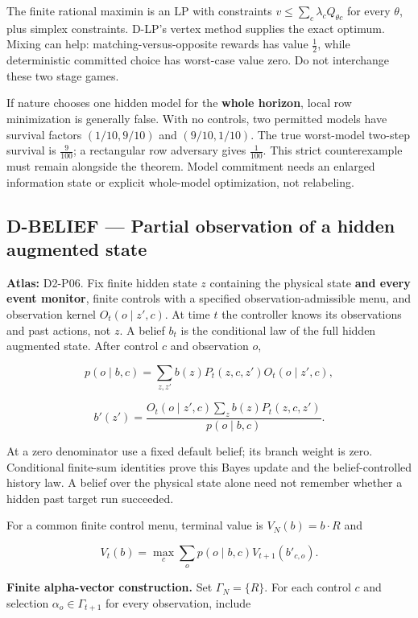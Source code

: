 \documentclass[
  11pt,
  a4paper,
]{article}
\begin{document}
The finite rational maximin is an LP with constraints
\(v\le\sum_c\lambda_cQ_{\theta c}\) for every \(\theta\), plus simplex
constraints. D-LP's vertex method supplies the exact optimum. Mixing can
help: matching-versus-opposite rewards has value \(\frac{1}{2}\), while
deterministic committed choice has worst-case value zero. Do not
interchange these two stage games.

If nature chooses one hidden model for the \textbf{whole horizon}, local
row minimization is generally false. With no controls, two permitted
models have survival factors \((1/10,9/10)\) and \((9/10,1/10)\). The
true worst-model two-step survival is \(\frac{9}{100}\); a rectangular
row adversary gives \(\frac{1}{100}\). This strict counterexample must
remain alongside the theorem. Model commitment needs an enlarged
information state or explicit whole-model optimization, not relabeling.

\subsection{D-BELIEF --- Partial observation of a hidden augmented
state}\label{d-belief-partial-observation-of-a-hidden-augmented-state}

\textbf{Atlas:} D2-P06. Fix finite hidden state \(z\) containing the
physical state \textbf{and every event monitor}, finite controls with a
specified observation-admissible menu, and observation kernel
\(O_t(o\mid z',c)\). At time \(t\) the controller knows its observations
and past actions, not \(z\). A belief \(b_t\) is the conditional law of
the full hidden augmented state. After control \(c\) and observation
\(o\),

\[p(o\mid b,c)=\sum_{z,z'}b(z)P_t(z,c,z')O_t(o\mid z',c),\]

\[b'(z')=\frac{O_t(o\mid z',c)\sum_zb(z)P_t(z,c,z')}
 {p(o\mid b,c)}.\]

At a zero denominator use a fixed default belief; its branch weight is
zero. Conditional finite-sum identities prove this Bayes update and the
belief-controlled history law. A belief over the physical state alone
need not remember whether a hidden past target run succeeded.

For a common finite control menu, terminal value is \(V_N(b)=b\cdot R\)
and

\[V_t(b)=\max_c\sum_o p(o\mid b,c)V_{t+1}(b'_{c,o}).\]

\textbf{Finite alpha-vector construction.} Set \(\Gamma_N=\{R\}\). For
each control \(c\) and selection \(\alpha_o\in\Gamma_{t+1}\) for every
observation, include
\end{document}

